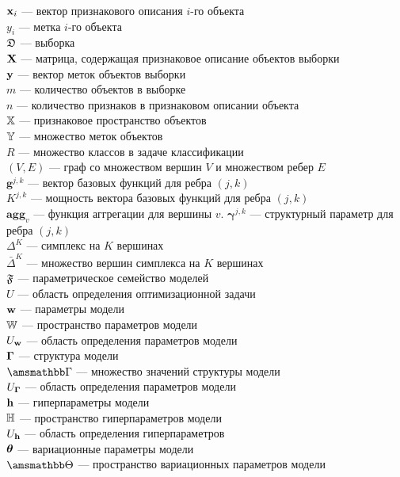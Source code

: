 \noindent$\mathbf{x}_i$ --- вектор признакового описания $i$-го объекта\\
$y_i$ --- метка $i$-го объекта\\
$\mathfrak{D}$ --- выборка\\
$\mathbf{X}$ --- матрица, содержащая признаковое описание объектов выборки\\
$\mathbf{y}$ --- вектор меток объектов выборки\\
$m$ --- количество объектов в выборке\\
$n$ --- количество признаков в признаковом описании объекта\\
$\mathbb{X}$ --- признаковое пространство объектов\\
$\mathbb{Y}$ --- множество меток объектов\\
$R$ --- множество классов в задаче классификации\\
$(V,E)$ --- граф со множеством вершин $V$ и множеством ребер $E$\\
$\mathbf{g}^{j,k}$ --- вектор базовых функций для ребра $(j,k)$\\
$K^{j,k}$ --- мощность вектора базовых функций для ребра $(j,k)$\\
$\textbf{agg}_v$ --- функция аггрегации для вершины $v$. 
$\boldsymbol{\gamma}^{j,k}$ --- структурный параметр для ребра $(j,k)$\\
$\Delta^{K}$ --- симплекс на $K$ вершинах\\
$\bar{\Delta}^{K}$ --- множество вершин симплекса на $K$ вершинах\\
$\mathfrak{F}$ --- параметрическое семейство моделей\\
$U$ --- область определения оптимизационной задачи\\
$\mathbf{w}$ --- параметры модели\\
$\mathbb{W}$ --- пространство параметров модели\\
$U_\mathbf{w}$ --- область определения параметров модели\\
$\boldsymbol{\Gamma}$ --- структура модели\\
$\Gb$ --- множество значений структуры модели\\
$U_{\boldsymbol{\Gamma}}$ --- область определения параметров модели\\
$\mathbf{h}$ --- гиперпараметры модели\\
$\mathbb{H}$ --- пространство гиперпараметров модели\\
$U_{\mathbf{h}}$ --- область определения гиперпараметров\\
$\boldsymbol{\theta}$ --- вариационные параметры модели\\
$\Tetab$ --- пространство вариационных параметров модели\\

